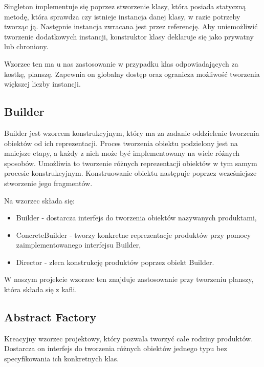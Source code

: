 \documentclass[a4paper, 11pt]{article}
\begin{document}
Singleton implementuje się poprzez stworzenie klasy, która posiada statyczną metodę, która sprawdza czy istnieje instancja danej klasy, w razie potrzeby tworząc ją. Następnie instancja zwracana jest przez referencję. Aby uniemożliwić tworzenie dodatkowych instancji, konstruktor klasy deklaruje się jako prywatny lub chroniony.

Wzorzec ten ma u nas zastosowanie w przypadku klas odpowiadających za kostkę, planszę. Zapewnia on globalny dostęp oraz ogranicza możliwość tworzenia większej liczby instancji. 

	\subsection{Builder}
	\indent
	
Builder jest wzorcem konstrukcyjnym, który ma za zadanie oddzielenie tworzenia obiektów od ich reprezentacji. 
Proces tworzenia obiektu podzielony jest na mniejsze etapy, a każdy z nich może być implementowany na wiele różnych sposobów. Umożliwia to tworzenie różnych reprezentacji obiektów w tym samym procesie konstrukcyjnym.
Konstruowanie obiektu następuje poprzez wcześniejsze stworzenie jego fragmentów.


Na wzorzec składa się:
\begin{itemize}

\item Builder - dostarcza interfejs do tworzenia obiektów nazywanych produktami,
\item ConcreteBuilder - tworzy konkretne reprezentacje produktów przy pomocy zaimplementowanego interfejsu Builder,
\item Director - zleca konstrukcję produktów poprzez obiekt Builder.
\end{itemize}

W naszym projekcie wzorzec ten znajduje zastosowanie przy tworzeniu planszy, która składa się z kafli.


	\subsection{Abstract Factory}
\indent

Kreacyjny wzorzec projektowy, który pozwala tworzyć całe rodziny produktów. Dostarcza on interfejs do tworzenia różnych obiektów jednego typu bez specyfikowania ich konkretnych klas.

\end{document}
